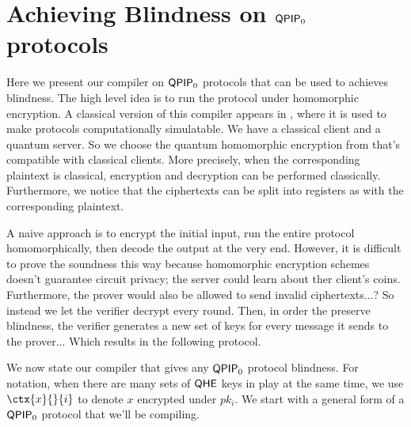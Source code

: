 \section{Achieving Blindness on $\operatorname{\mathsf{QPIP}}_0$ protocols}
\label{sec:BlindBQP2}

Here we present our compiler on $\operatorname{\mathsf{QPIP}}_0$ protocols that can be used to achieves blindness.
The high level idea is to run the protocol under homomorphic encryption.
A classical version of this compiler appears in \cite{KMThesis}, where it is used to make protocols computationally simulatable.
We have a classical client and a quantum server.
So we choose the quantum homomorphic encryption from \cite{mahadev_qfhe} that's compatible with classical clients.
More precisely, when the corresponding plaintext is classical, encryption and decryption can be performed classically.
Furthermore, we notice that the ciphertexts can be split into registers as with the corresponding plaintext.

A naive approach is to encrypt the initial input,
run the entire protocol homomorphically,
then decode the output at the very end.
However, it is difficult to prove the soundness this way because homomorphic encryption schemes doesn't guarantee circuit privacy;
the server could learn about ther client's coins.
Furthermore, the prover would also be allowed to send invalid ciphertexts...?
So instead we let the verifier decrypt every round.
Then, in order the preserve blindness, the verifier generates a new set of keys for every message it sends to the prover...
Which results in the following protocol.


We now state our compiler that gives any $\operatorname{\mathsf{QPIP}}_0$ protocol blindness.
For notation, when there are many sets of $\mathsf{QHE}$ keys in play at the same time,
we use $\ctx{x}{}{i}$ to denote $x$ encrypted under $pk_i$.
We start with a general form of a $\operatorname{\mathsf{QPIP}}_0$ protocol that we'll be compiling.

